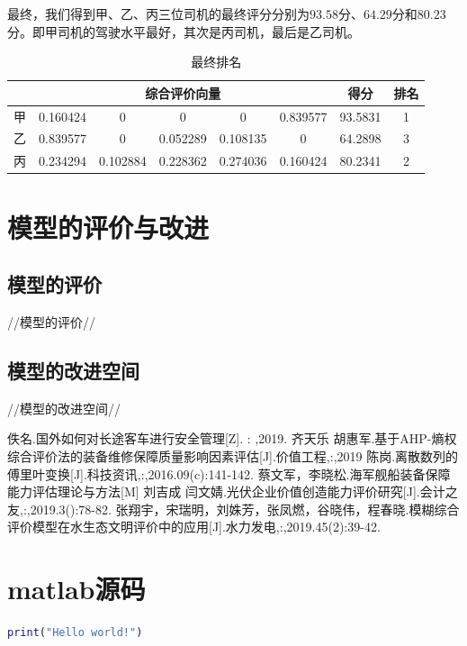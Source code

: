 \documentclass[bwprint]{cumcmthesis}
\begin{document}
            最终，我们得到甲、乙、丙三位司机的最终评分分别为$93.58$分、$64.29$分和$80.23$分。即甲司机的驾驶水平最好，其次是丙司机，最后是乙司机。
            \begin{table}[htbp]
                \centering
                \caption{最终排名}
                    \begin{tabular}{|c|c|c|c|c|c|c|c|}
                    \hline
                            & \multicolumn{5}{c|}{综合评价向量}    & 得分    & 排名 \\
                    \hline
                    甲     & 0.160424 & 0     & 0     & 0     & 0.839577 & 93.5831 & 1 \\
                    \hline
                    乙     & 0.839577 & 0     & 0.052289 & 0.108135 & 0     & 64.2898 & 3 \\
                    \hline
                    丙     & 0.234294 & 0.102884 & 0.228362 & 0.274036 & 0.160424 & 80.2341 & 2 \\
                    \hline
                    \end{tabular}
                \label{tab:eleven}
            \end{table}

    \section{模型的评价与改进}
    \subsection{模型的评价}
    //模型的评价//
    \subsection{模型的改进空间}
    //模型的改进空间//
    \begin{thebibliography}{9}
         佚名.国外如何对长途客车进行安全管理[Z]. : ,2019.
         齐天乐 胡惠军.基于AHP-熵权综合评价法的装备维修保障质量影响因素评估[J].价值工程,:,2019
         陈岗.离散数列的傅里叶变换[J].科技资讯,:,2016.09(c):141-142.
         蔡文军，李晓松.海军舰船装备保障能力评估理论与方法[M]
         刘吉成 闫文婧.光伏企业价值创造能力评价研究[J].会计之友,:,2019.3():78-82.
        张翔宇，宋瑞明，刘姝芳，张凤燃，谷晓伟，程春晓.模糊综合评价模型在水生态文明评价中的应用[J].水力发电,:,2019.45(2):39-42.
       
    \end{thebibliography}
    \newpage
    \appendix
        \section{matlab源码}
        \begin{lstlisting}[language=matlab]
            print("Hello world!")
        \end{lstlisting}
\end{document}
